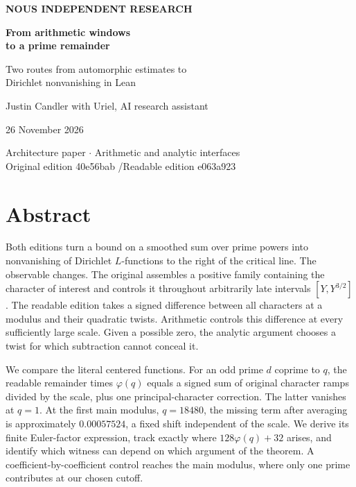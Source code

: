 \documentclass[12pt,letterpaper]{article}
\begin{document}
\thispagestyle{empty}
\begin{center}\vspace*{.5in}
{\sffamily\small\bfseries\color{accent}NOUS INDEPENDENT RESEARCH}\par\vspace{.55in}
{\fontsize{32}{38}\selectfont\bfseries\color{ink}From arithmetic windows\\to a prime remainder}\par\vspace{.25in}
{\Large Two routes from automorphic estimates to\\Dirichlet nonvanishing in Lean}\par\vspace{.35in}
\par\vspace{.43in}
{\large Justin Candler with Uriel, AI research assistant}\par 26 November 2026
\end{center}\vfill\begin{center}\small\sffamily Architecture paper $\cdot$ Arithmetic and analytic interfaces\\
Original edition 40e56bab \enspace/\enspace Readable edition e063a923\end{center}
\clearpage
\section*{Abstract}
Both editions turn a bound on a smoothed sum over prime powers into nonvanishing of Dirichlet $L$-functions to the right of the critical line. The observable changes. The original assembles a positive family containing the character of interest and controls it throughout arbitrarily late intervals $[Y,Y^{3/2}]$. The readable edition takes a signed difference between all characters at a modulus and their quadratic twists. Arithmetic controls this difference at every sufficiently large scale. Given a possible zero, the analytic argument chooses a twist for which subtraction cannot conceal it.

We compare the literal centered functions. For an odd prime $d$ coprime to $q$, the readable remainder times $\varphi(q)$ equals a signed sum of original character ramps divided by the scale, plus one principal-character correction. The latter vanishes at $q=1$. At the first main modulus, $q=18480$, the missing term after averaging is approximately $0.00057524$, a fixed shift independent of the scale. We derive its finite Euler-factor expression, track exactly where $128\varphi(q)+32$ arises, and identify which witness can depend on which argument of the theorem. A coefficient-by-coefficient control reaches the main modulus, where only one prime contributes at our chosen cutoff.
\end{document}

